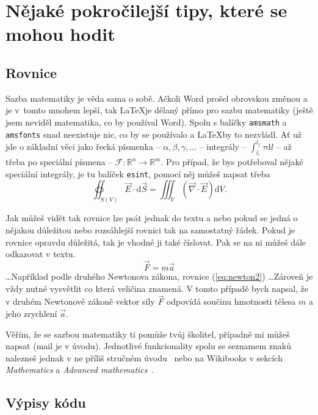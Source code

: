 \documentclass[12pt, a4paper,
 twoside,        %
 openright
]{report}
\newcommand{\dif}{\mathrm{d}} %
\begin{document}
\section[Pokročilejší tipy]{Nějaké pokročilejší tipy, které se mohou hodit}

\subsection{Rovnice}

Sazba matematiky je věda sama o sobě. Ačkoli Word prošel obrovskou změnou a je v~tomto mnohem lepší, tak \LaTeX je dělaný přímo pro sazbu matematiky (ještě jsem neviděl matematika, co by používal Word). Spolu s balíčky \texttt{amsmath} a \texttt{amsfonts} snad neexistuje nic, co by se používalo a \LaTeX by to nezvládl. Ať už jde o základní věci jako řecká písmenka -- $\alpha, \beta, \gamma, \dots$ -- integrály -- $\int_{l_i}^{l_f} \tau \dif l $ -- až třeba po speciální písmena -- $\mathscr{F}: \mathbb{R}^n \to \mathbb{R}^m$. Pro případ, že bys potřeboval nějaké speciální integrály, je tu balíček \texttt{esint}, pomocí něj můžeš napsat třeba
$$ \oiint_{S(V)} \vec{E} \cdot \dif \vec{S} = \iiint_{V} \left(\vec{\nabla} \cdot \vec{E}\right) \dif V .$$

Jak můžeš vidět tak rovnice lze psát jednak do textu a nebo pokud se jedná o nějakou důležitou nebo rozsáhlejší rovnici tak na samostatný řádek. Pokud je rovnice opravdu důležitá, tak je vhodné ji také číslovat. Pak se na ni můžeš dále odkazovat v textu.
\begin{equation}
    \vec{F} = m \vec{a}
    \label{eq:newton2}
\end{equation}
\dots Například podle druhého Newtonova zákona, rovnice (\ref{eq:newton2}) \dots Zároveň je vždy nutné vysvětlit co která veličina znamená. V tomto případě bych napsal, že v druhém Newtonově zákoně vektor síly $\vec F$ odpovídá součinu hmotnosti tělesa $m$ a jeho zrychlení $\vec a$. 

Věřím, že se sazbou matematiky ti pomůže tvůj školitel, případně mi můžeš napsat (mail je v úvodu). Jednotlivé funkcionality spolu se seznamem znaků nalezneš jednak v ne příliš stručném úvodu~\cite{LaTeXprirucka} nebo na Wikibooks v sekcích \emph{Mathematics} a \emph{Advanced mathematics}~\cite{wikibooksLaTeX}.

\subsection{Výpisy kódu}
\end{document}
